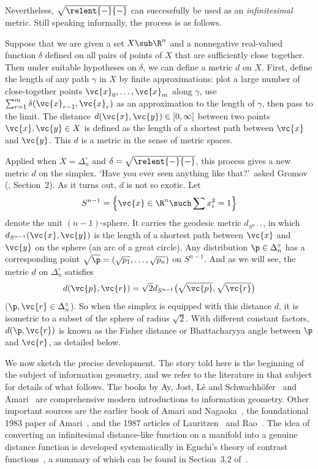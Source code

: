 Nevertheless, $\sqrt{\relent{-}{-}}$ can successfully be used as an
\emph{infinitesimal}%
%
% 
metric.  Still speaking informally, the process is as follows.

Suppose that we are given a set $X \sub \R^n$ and a nonnegative real-valued
function $\delta$ defined on all pairs of points of $X$ that are
sufficiently close together. Then under suitable hypotheses on $\delta$, we
can define a metric $d$ on $X$.  First, define the length of any path
$\gamma$ in $X$ by finite approximations: plot a large number of
close-together points $\vc{x}_0, \ldots, \vc{x}_m$ along $\gamma$, use
$\sum_{r = 1}^m \delta(\vc{x}_{r - 1}, \vc{x}_r)$ as an approximation to
the length of $\gamma$, then pass to the limit.  The distance $d(\vc{x},
\vc{y}) \in [0, \infty]$ between two points $\vc{x}, \vc{y} \in X$ is
defined as the length of a shortest path between $\vc{x}$ and $\vc{y}$.
This $d$ is a metric in the sense of metric spaces.

Applied when $X = \Delta_n^\circ$ and $\delta = \sqrt{\relent{-}{-}}$, this
process gives a new metric $d$%
%
% 
on the simplex.  `Have you ever seen anything like that?'\ asked Gromov%
% 
% 
(\cite{GromSS1}, Section~2).  As it turns out, $d$ is not so exotic.  Let
\[
S^{n - 1} = \Bigl\{ \vc{x} \in \R^n \such \sum x_i^2 = 1 \Bigr\}
\]
denote the unit $(n - 1)$-sphere.  It carries the geodesic metric $d_{S^{n
    - 1}}$, in which $d_{S^{n - 1}}(\vc{x}, \vc{y})$ is the length of a
shortest path between $\vc{x}$ and $\vc{y}$ on the sphere (an arc of a
great circle).  Any distribution $\p \in \Delta_n^\circ$ has a
corresponding point $\sqrt{\p} = (\sqrt{p_1}, \ldots, \sqrt{p_n})$ on $S^{n
  - 1}$.  And as we will see, the metric $d$ on $\Delta_n^\circ$ satisfies
\[
d(\vc{p}, \vc{r}) 
= 
\sqrt{2} d_{S^{n - 1}}\bigl(\sqrt{\vc{p}}, \sqrt{\vc{r}}\bigr)
\]
($\p, \vc{r} \in \Delta_n^\circ$).  So when the simplex is equipped with
this distance $d$, it is isometric to a subset of the sphere of radius
$\sqrt{2}$.  With different constant factors, $d(\p, \vc{r})$ is known
as the Fisher%
%
% 
distance or Bhattacharyya%
%
% 
angle between $\p$ and $\vc{r}$, as detailed below.

We now sketch the precise development.  The story told here is the
beginning of the subject of information%
%
% 
geometry, and we refer to the literature in that subject for details of
what follows.  The books by Ay, Jost, L{\^e} and
Schwachh{\"o}fer~\cite{AJLS} and Amari~\cite{AmarIGA} are comprehensive
modern introductions to information geometry.  Other important sources are
the earlier book of Amari and Nagaoka~\cite{AmNa}, the foundational 1983
paper of Amari~\cite{AmarFIG}, and the 1987 articles of
Lauritzen~\cite{Laur} and Rao~\cite{RaoDMP}.  The idea of converting an
infinitesimal distance-like function on a manifold into a genuine distance
function is developed systematically in Eguchi's theory of contrast
functions~\cite{EgucDGA,EgucGMC}, a summary of which can be found in
Section~3.2 of~\cite{AmNa}.

